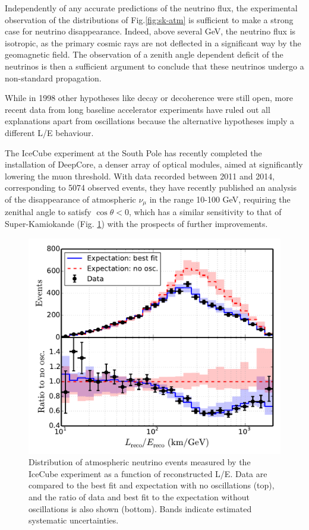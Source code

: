 Independently of any accurate predictions of the neutrino flux, the experimental observation of the distributions of Fig.\ref{fig:sk-atm} is sufficient to make a strong case for neutrino disappearance. Indeed, above several GeV, the neutrino flux is isotropic, as the primary cosmic rays are not deflected in a significant way by the geomagnetic field. The observation of a zenith angle dependent deficit of the neutrinos is then a sufficient argument to conclude that these neutrinos undergo a non-standard propagation.  

While in 1998 other hypotheses like decay or decoherence were still open, more recent data from long baseline accelerator experiments have ruled out all explanations apart from oscillations because the alternative hypotheses imply a different L/E behaviour. 
    
The IceCube experiment at the South Pole has recently completed the installation of DeepCore, a denser array of optical modules, aimed at significantly lowering the muon threshold. With data recorded between 2011 and 2014, corresponding to 5074 observed events, they have recently published an analysis of the disappearance of atmospheric $\nu_\mu$  \cite{Aartsen2016161} in the range 10-100 GeV, requiring the zenithal angle to satisfy $\cos \theta < 0$,  which has a similar sensitivity to that of Super-Kamiokande (Fig. \ref{fig:icecubeosc}) with the prospects of further improvements. 


\begin{figure}[htbp]
\centering
\includegraphics[width=0.6\linewidth]{figures/icecube_osc2014_data_mc_LE.pdf}
  \caption{Distribution of atmospheric neutrino events measured by the IceCube experiment\cite{Aartsen2016161} as a function of
reconstructed L/E. Data are compared to the best fit and
expectation with no oscillations (top), and the ratio of data
and best fit to the expectation without oscillations is also shown
(bottom). Bands indicate estimated systematic uncertainties.}
 \label{fig:icecubeosc}
 \end{figure}